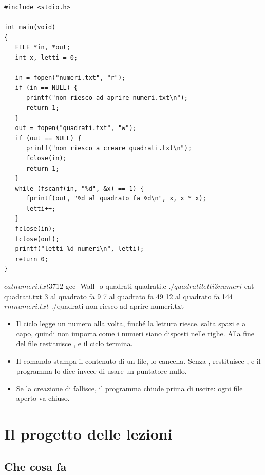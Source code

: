 \begin{affianco}[0.55][c]
\begin{lstlisting}[style=c, name=quadrati.c]
#include <stdio.h>

int main(void)
{
   FILE *in, *out;
   int x, letti = 0;

   in = fopen("numeri.txt", "r");
   if (in == NULL) {
      printf("non riesco ad aprire numeri.txt\n");
      return 1;
   }
   out = fopen("quadrati.txt", "w");
   if (out == NULL) {
      printf("non riesco a creare quadrati.txt\n");
      fclose(in);
      return 1;
   }
   while (fscanf(in, "%d", &x) == 1) {
      fprintf(out, "%d al quadrato fa %d\n", x, x * x);
      letti++;
   }
   fclose(in);
   fclose(out);
   printf("letti %d numeri\n", letti);
   return 0;
}
\end{lstlisting}
\risultato
\begin{console}
$ cat numeri.txt
3 7
12
$ gcc -Wall -o quadrati quadrati.c
$ ./quadrati
letti 3 numeri
$ cat quadrati.txt
3 al quadrato fa 9
7 al quadrato fa 49
12 al quadrato fa 144
$ rm numeri.txt
$ ./quadrati
non riesco ad aprire numeri.txt
\end{console}
\end{affianco}

\begin{itemize}
  \item Il ciclo  legge un numero
        alla volta, finché la lettura riesce.  salta spazi e a
        capo, quindi non importa come i numeri siano disposti nelle righe.
        Alla fine del file restituisce , e il ciclo termina.
  \item Il comando  stampa il contenuto di un file,  lo
        cancella. Senza ,  restituisce
        , e il programma lo dice invece di usare un puntatore
        nullo.
  \item Se la creazione di  fallisce, il programma chiude
         prima di uscire: ogni file aperto va chiuso.
\end{itemize}

\section{Il progetto delle lezioni}

\subsection{Che cosa fa}

